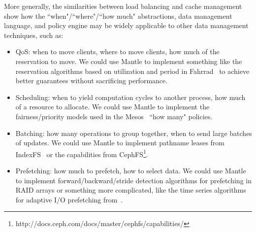 More generally, the similarities between load balancing and cache management
show how the ``when"/``where"/``how much" abstractions, data management
language, and policy engine may be widely applicable to other data management
techniques, such as:

\begin{itemize}

  \item QoS: when to move clients, where to move clients, how much of the
reservation to move. We could use Mantle to implement something like the
reservation algorithms based on utilization and period in
Fahrrad~\cite{povzner_horizon_2010} to achieve better guarantees without
sacrificing performance.

  \item Scheduling: when to yield computation cycles to another process, how
much of a resource to allocate. We could use Mantle to implement the
fairness/priority models used in the Mesos~\cite{hindman_mesos_2011} ``how
many" policies.

  \item Batching: how many operations to group together, when to send large
batches of updates. We could use Mantle to implement pathname leases from
IndexFS~\cite{ren:sc2014-indexfs} or the capabilities from
CephFS\footnote{http://docs.ceph.com/docs/master/cephfs/capabilities/}.

  \item Prefetching: how much to prefetch, how to select data.  We could use
Mantle to implement forward/backward/stride detection algorithms for
prefetching in RAID arrays or something more complicated, like the time series
algorithms for adaptive I/O prefetching from~\cite{tran:sc01-arima}.

\end{itemize}
